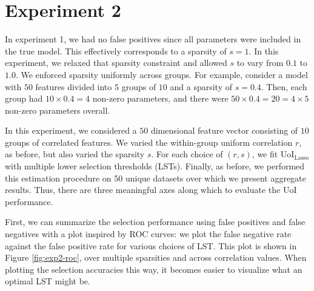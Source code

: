 \documentclass[11pt]{article}
\begin{document}
\section{Experiment 2}
In experiment 1, we had no false positives since all parameters were included in the true model. This effectively corresponds to a sparsity of $s=1.$ In this experiment, we relaxed that sparsity constraint and allowed $s$ to vary from $0.1$ to $1.0$. We enforced sparsity uniformly across groups. For example, consider a model with $50$ features divided into $5$ groups of $10$ and a sparsity of $s=0.4$. Then, each group had $10 \times 0.4 = 4$ non-zero parameters, and there were $50\times 0.4 = 20 = 4\times 5$ non-zero parameters overall. 

In this experiment, we considered a $50$ dimensional feature vector consisting of $10$ groups of correlated features. We varied the within-group uniform correlation $r$, as before, but also varied the sparsity $s$. For each choice of $(r,s)$, we fit UoI$_{\text{Lasso}}$ with multiple lower selection thresholds (LSTs). Finally, as before, we performed this estimation procedure on 50 unique datasets over which we present aggregate results. Thus, there are three meaningful axes along which to evaluate the UoI performance. 

First, we can summarize the selection performance using false positives and false negatives with a plot inspired by ROC curves: we plot the false negative rate against the false positive rate for various choices of LST. This plot is shown in Figure \ref{fig:exp2-roc}, over multiple sparsities and across correlation values. When plotting the selection accuracies this way, it becomes easier to visualize what an optimal LST might be.
\end{document}
